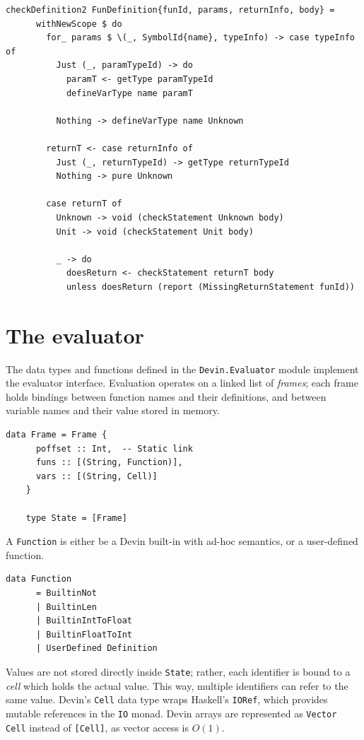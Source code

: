 \documentclass[UdineBachThesis,american,11pt]{PhdThesis}
\begin{document}
  \begin{Verbatim}[gobble=4,fontsize=\small]
    checkDefinition2 FunDefinition{funId, params, returnInfo, body} =
      withNewScope $ do
        for_ params $ \(_, SymbolId{name}, typeInfo) -> case typeInfo of
          Just (_, paramTypeId) -> do
            paramT <- getType paramTypeId
            defineVarType name paramT

          Nothing -> defineVarType name Unknown

        returnT <- case returnInfo of
          Just (_, returnTypeId) -> getType returnTypeId
          Nothing -> pure Unknown

        case returnT of
          Unknown -> void (checkStatement Unknown body)
          Unit -> void (checkStatement Unit body)

          _ -> do
            doesReturn <- checkStatement returnT body
            unless doesReturn (report (MissingReturnStatement funId))
  \end{Verbatim}

  \section{The evaluator}

  The data types and functions defined in the \mbox{\texttt{Devin.Evaluator}}
  module implement the evaluator interface. Evaluation operates on a linked list
  of \emph{frames}; each frame holds bindings between function names and their
  definitions, and between variable names and their value stored in memory.

  \begin{Verbatim}[gobble=4,fontsize=\small]
    data Frame = Frame {
      poffset :: Int,  -- Static link
      funs :: [(String, Function)],
      vars :: [(String, Cell)]
    }

    type State = [Frame]
  \end{Verbatim}

  A \mbox{\texttt{Function}} is either be a Devin built-in with ad-hoc
  semantics, or a user-defined function.

  \begin{Verbatim}[gobble=4,fontsize=\small]
    data Function
      = BuiltinNot
      | BuiltinLen
      | BuiltinIntToFloat
      | BuiltinFloatToInt
      | UserDefined Definition
  \end{Verbatim}

  Values are not stored directly inside \mbox{\texttt{State}}; rather, each
  identifier is bound to a \emph{cell} which holds the actual value. This way,
  multiple identifiers can refer to the same value. Devin's \mbox{\texttt{Cell}}
  data type wraps Haskell's \mbox{\texttt{IORef}}, which provides mutable
  references in the \mbox{\texttt{IO}} monad. Devin arrays are represented as
  \mbox{\texttt{Vector Cell}} instead of \mbox{\texttt{[Cell]}}, as vector
  access is \mbox{$O\mathopen{}\left(1\right)\mathclose{}$}.
\end{document}
